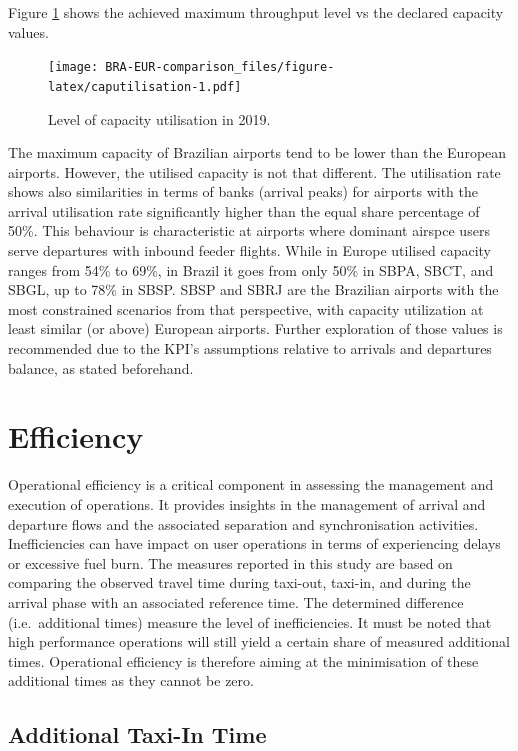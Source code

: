 \documentclass[
]{book}
\begin{document}
Figure \ref{fig:caputilisation} shows the achieved maximum throughput level vs the declared capacity values.



\begin{figure}
\centering
\texttt{[image: BRA-EUR-comparison\_files/figure-latex/caputilisation-1.pdf]}
\caption{\label{fig:caputilisation}Level of capacity utilisation in 2019.}
\end{figure}

The maximum capacity of Brazilian airports tend to be lower than the European airports.
However, the utilised capacity is not that different.
The utilisation rate shows also similarities in terms of banks (arrival peaks) for airports with the arrival utilisation rate significantly higher than the equal share percentage of 50\%.
This behaviour is characteristic at airports where dominant airspce users serve departures with inbound feeder flights.
While in Europe utilised capacity ranges from 54\% to 69\%, in Brazil it goes from only 50\% in SBPA, SBCT, and SBGL, up to 78\% in SBSP.
SBSP and SBRJ are the Brazilian airports with the most constrained scenarios from that perspective, with capacity utilization at least similar (or above) European airports.
Further exploration of those values is recommended due to the KPI's assumptions relative to arrivals and departures balance, as stated beforehand.

\hypertarget{efficiency}{%
\chapter{Efficiency}\label{efficiency}}

Operational efficiency is a critical component in assessing the management and execution of operations.
It provides insights in the management of arrival and departure flows and the associated separation and synchronisation activities.
Inefficiencies can have impact on user operations in terms of experiencing delays or excessive fuel burn.
The measures reported in this study are based on comparing the observed travel time during taxi-out, taxi-in, and during the arrival phase with an associated reference time.
The determined difference (i.e.~additional times) measure the level of inefficiencies.
It must be noted that high performance operations will still yield a certain share of measured additional times.
Operational efficiency is therefore aiming at the minimisation of these additional times as they cannot be zero.

\hypertarget{additional-taxi-in-time}{%
\section{Additional Taxi-In Time}\label{additional-taxi-in-time}}
\end{document}
